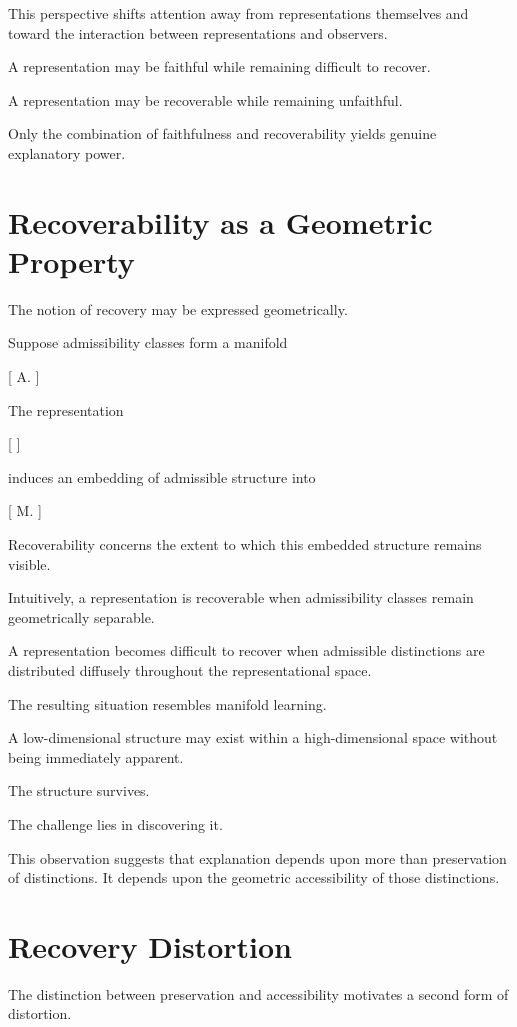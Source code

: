 \documentclass[11pt,oneside,openany]{book}
\begin{document}
This perspective shifts attention away from representations themselves and toward the interaction between representations and observers.

A representation may be faithful while remaining difficult to recover.

A representation may be recoverable while remaining unfaithful.

Only the combination of faithfulness and recoverability yields genuine explanatory power.

\section{Recoverability as a Geometric Property}

The notion of recovery may be expressed geometrically.

Suppose admissibility classes form a manifold

[
\mathcal A.
]

The representation

[
\pi
]

induces an embedding of admissible structure into

[
\mathcal M.
]

Recoverability concerns the extent to which this embedded structure remains visible.

Intuitively, a representation is recoverable when admissibility classes remain geometrically separable.

A representation becomes difficult to recover when admissible distinctions are distributed diffusely throughout the representational space.

The resulting situation resembles manifold learning.

A low-dimensional structure may exist within a high-dimensional space without being immediately apparent.

The structure survives.

The challenge lies in discovering it.

This observation suggests that explanation depends upon more than preservation of distinctions. It depends upon the geometric accessibility of those distinctions.

\section{Recovery Distortion}

The distinction between preservation and accessibility motivates a second form of distortion.
\end{document}

